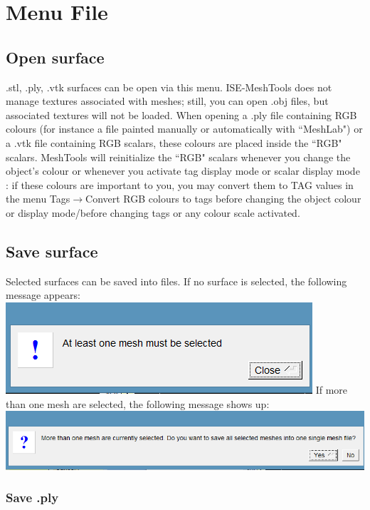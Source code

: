 \chapter{Menu File}
\minitoc  

\section{Open surface}
.stl, .ply, .vtk surfaces can be open via this menu. ISE-MeshTools does not manage textures associated with meshes; still, you can open .obj files, but associated textures will not be loaded. When opening a .ply file containing RGB colours (for instance a file painted manually or automatically with ``MeshLab") or a .vtk file containing RGB scalars, these colours are placed inside the ``RGB" scalars. MeshTools will reinitialize the ``RGB" scalars whenever you change the object’s colour or whenever you activate tag display mode or scalar display mode : if these colours are important to you, you may convert them to TAG values in the menu Tags$\rightarrow$Convert RGB colours to tags before changing the object colour or display mode/before changing tags or any colour scale activated.

\section{Save surface}
Selected surfaces can be saved into files. If no surface is selected, the following message appears:\\
\includegraphics[scale=0.5]{images/File/Save_message.png}
If more than one mesh are selected, the following message shows up:\\
\includegraphics[scale=0.5]{images/File/Save_message2.png}

\subsection{Save .ply}

